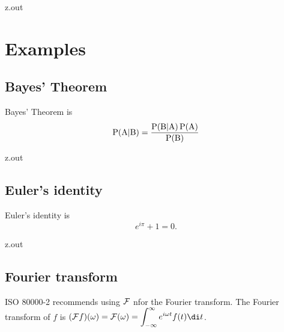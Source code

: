 \begin{VerbatimOut}{z.out}


\section{Examples}

\subsection{Bayes' Theorem}

Bayes' Theorem
\cite{bayes}
is
{
  \UndefineShortVerb{\|}
  \begin{equation}
    \text{P}(\text A|\text B)
    = \frac{\text P(\text B|\text A)\,\text P(\text A)}{\text P(\text B)}
  \end{equation}
}
\end{VerbatimOut}

\MyIO


\begin{VerbatimOut}{z.out}

\subsection{Euler's identity}

Euler's identity
\cite{eulers-identity}
is
\begin{equation}
  e^{i\pi} + 1 = 0.
\end{equation}
\end{VerbatimOut}

\MyIO


\begin{VerbatimOut}{z.out}

\subsection{Fourier transform}

ISO 80000-2
\cite[page 25]{iso80000-2}
recommends using
\(\mathcal{F}\)
nfor the Fourier transform.
The Fourier transform of \(f\) is
\(
  \displaystyle
  (\Fourier f)(\omega)
  = \Fourier (\omega)
  = \int_{-\infty}^\infty e^{i\omega t} f(t) \di t
\).
\end{VerbatimOut}

\MyIO



